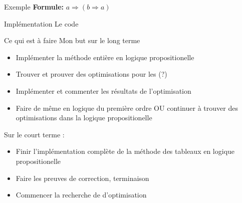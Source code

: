 \documentclass{beamer}
\begin{document}
\begin{frame}{Exemple}
    \textbf{Formule:} $a \Rightarrow (b \Rightarrow a)$

    \begin{center}
    \end{center}
\end{frame}

\begin{frame}{Implémentation}
    Le code
\end{frame}

\begin{frame}{Ce qui est à faire}
    Mon but sur le long terme
    \begin{itemize}[<+->]
        \item Implémenter la méthode entière en logique propositionelle
        \item Trouver et prouver des optimisations pour les (?)
        \item Implémenter et commenter les résultats de l'optimisation
        \item Faire de même en logique du première ordre OU continuer à trouver des optimisations dans la logique propositionelle
    \end{itemize}
    \pause
    Sur le court terme :
    \begin{itemize}[<+->]
        \item Finir l'implémentation complète de la méthode des tableaux en logique propositionelle
        \item Faire les preuves de correction, terminaison
        \item Commencer la recherche de d'optimisation
    \end{itemize}
\end{frame}
\end{document}
